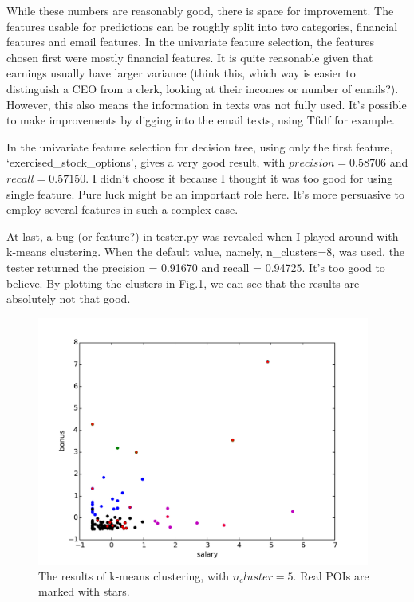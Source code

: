 \documentclass[12pt]{article}
\begin{document}
While these numbers are reasonably good, there is space for improvement. The features usable for predictions can be roughly split into two categories, financial features and email features. In the univariate feature selection, the features chosen first were mostly financial features. It is quite reasonable given that earnings usually have larger variance (think this, which way is easier to distinguish a CEO from a clerk, looking at their incomes or number of emails?). However, this also means the information in texts was not fully used. It's possible to make improvements by digging into the email texts, using Tfidf for example.

In the univariate feature selection for decision tree, using only the first feature, `exercised\_stock\_options', gives a very good result, with $precision = 0.58706$ and $recall = 0.57150$. I didn't choose it because I thought it was too good for using single feature. Pure luck might be an important role here. It's more persuasive to employ several features in such a complex case.

At last, a bug (or feature?) in tester.py was revealed when I played around with k-means clustering. When the default value, namely, n\_clusters=8, was used, the tester returned the precision = 0.91670  and recall = 0.94725. It's too good to believe. By plotting the clusters in Fig.1, we can see that the results are absolutely not that good.
\begin{figure}[!h]
\centering\includegraphics[width=4.3in]{clusters_after_scaling.pdf}
\caption{The results of k-means clustering, with $n_cluster = 5$. Real POIs are marked with stars.}
\end{figure}
\end{document}
